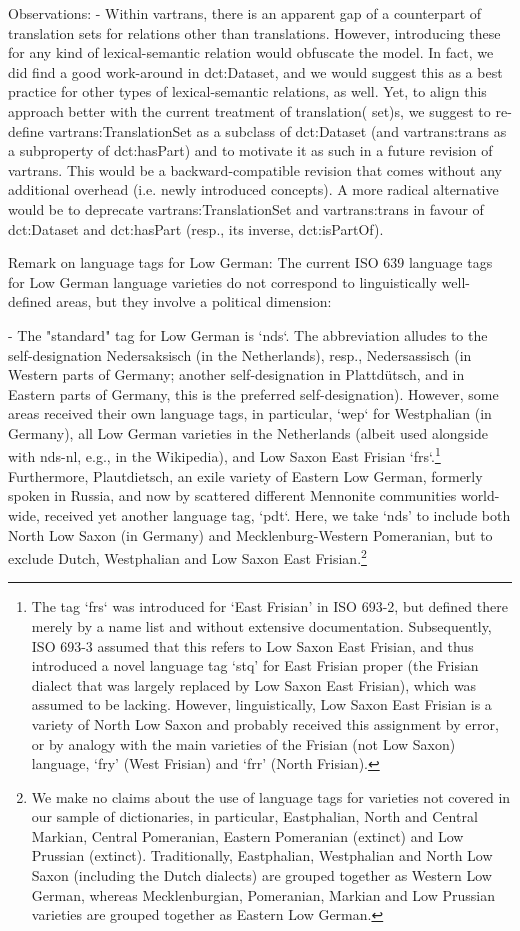 \documentclass{article}
\begin{document}
Observations:
- Within vartrans, there is an apparent gap of a counterpart of translation sets for relations other than translations. However, introducing these for any kind of lexical-semantic relation would obfuscate the model. In fact, we did find a good work-around in dct:Dataset, and we would suggest this as a best practice for other types of lexical-semantic relations, as well. Yet, to align this approach better with the current treatment of translation( set)s, we suggest to re-define vartrans:TranslationSet as a subclass of dct:Dataset (and vartrans:trans as a subproperty of dct:hasPart) and to motivate it as such in a future revision of vartrans. This would be a backward-compatible revision that comes without any additional overhead (i.e. newly introduced concepts). A more radical alternative would be to deprecate vartrans:TranslationSet and vartrans:trans in favour of dct:Dataset and dct:hasPart (resp., its inverse, dct:isPartOf).

Remark on language tags for Low German: The current ISO 639 language tags for Low German language varieties do not correspond to linguistically well-defined areas, but they involve a political dimension:

- The "standard" tag for Low German is `nds`. The abbreviation alludes to the self-designation Nedersaksisch (in the Netherlands), resp., Nedersassisch (in Western parts of Germany; another self-designation in Plattdütsch, and in Eastern parts of Germany, this is the preferred self-designation). However, some areas received their own language tags, in particular, `wep` for Westphalian (in Germany), all Low German varieties in the Netherlands (albeit used alongside with nds-nl, e.g., in the Wikipedia), and Low Saxon East Frisian `frs`.\footnote{
	The tag `frs` was introduced for `East Frisian' in ISO 693-2, but defined there merely by a name list and without extensive documentation. Subsequently, ISO 693-3 assumed that this refers to Low Saxon East Frisian, and thus introduced a novel language tag `stq' for East Frisian proper (the Frisian dialect that was largely replaced by Low Saxon East Frisian), which was assumed to be lacking. However, linguistically, Low Saxon East Frisian is a variety of North Low Saxon and probably received this assignment by error, or by analogy with the main varieties of the Frisian (not Low Saxon) language, `fry' (West Frisian) and `frr' (North Frisian).
} Furthermore, Plautdietsch, an exile variety of Eastern Low German, formerly spoken in Russia, and now by scattered different Mennonite communities world-wide, received yet another language tag, `pdt`. Here, we take `nds' to include both North Low Saxon (in Germany) and Mecklenburg-Western Pomeranian, but to exclude Dutch, Westphalian and Low Saxon East Frisian.\footnote{
	We make no claims about the use of language tags for varieties not covered in our sample of dictionaries, in particular, Eastphalian, North and Central Markian, Central Pomeranian, Eastern Pomeranian (extinct) and Low Prussian (extinct). Traditionally, Eastphalian, Westphalian and North Low Saxon (including the Dutch dialects) are grouped together as Western Low German, whereas Mecklenburgian, Pomeranian, Markian and Low Prussian varieties are grouped together as Eastern Low German.
}
\end{document}
